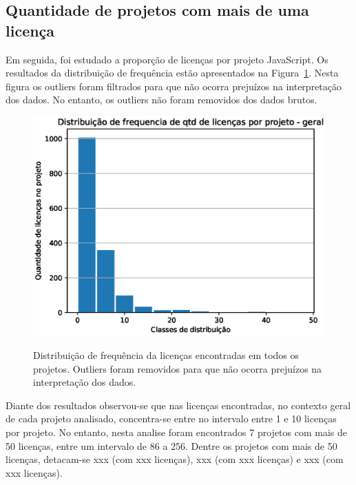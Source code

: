
\subsection{Quantidade de projetos com mais de uma licença}

Em seguida, foi estudado a proporção de licenças por projeto JavaScript. 
Os resultados da distribuição de frequência estão apresentados na Figura~\ref{local-licencas-raiz}. Nesta figura os outliers foram filtrados para que não ocorra prejuízos na interpretação dos dados. No entanto, os outliers não foram removidos dos dados brutos.

\begin{figure}[H]
    \centering
    \caption{Distribuição de frequência da licenças encontradas em todos os projetos. Outliers foram removidos para que não ocorra prejuízos na interpretação dos dados.}
    \includegraphics[scale=0.8]{figuras/resultados/hit_qtd_projeto.eps}
    \label{local-licencas-raiz}
\end{figure}


Diante dos resultados observou-se que nas licenças encontradas, no contexto geral de cada projeto analisado, concentra-se entre no intervalo entre 1 e 10 licenças por projeto.
No entanto, nesta analise foram encontrados 7 projetos com mais de 50 licenças, entre um intervalo de 86 a 256. Dentre os projetos com mais de 50 licenças, detacam-se xxx (com xxx licenças), xxx (com xxx licenças) e xxx (com xxx licenças).

